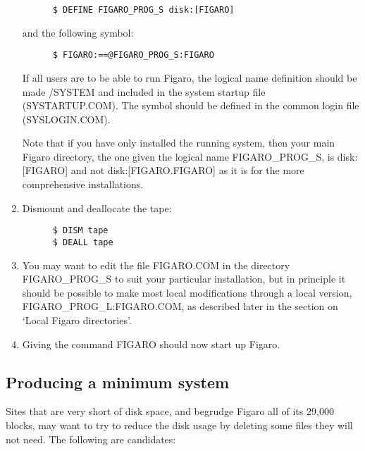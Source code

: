 \begin{enumerate}
\begin{verbatim}
      $ DEFINE FIGARO_PROG_S disk:[FIGARO]
\end{verbatim}
and the following symbol:
\begin{verbatim}
      $ FIGARO:==@FIGARO_PROG_S:FIGARO
\end{verbatim}
             
If all users are to be able to run Figaro, the logical name definition  should
be made /SYSTEM and included in the system startup file (SYSTARTUP.COM).  The
symbol should be defined in the common login file (SYSLOGIN.COM).

Note that if you have only installed the running system, then your main  Figaro
directory, the one given the logical name FIGARO\_PROG\_S, is disk:[FIGARO] and
not disk:[FIGARO.FIGARO] as it is for the more comprehensive installations.

\item Dismount and deallocate the tape:

\begin{verbatim}
      $ DISM tape
      $ DEALL tape
\end{verbatim}

\item You may want to edit the file FIGARO.COM in the directory FIGARO\_PROG\_S
to suit your particular installation, but in principle it should be possible to
make most local modifications through  a local version,
FIGARO\_PROG\_L:FIGARO.COM, as described later in the section on `Local Figaro
directories'.

\item Giving the command FIGARO should now start up Figaro.

\end{enumerate}

\subsection{Producing a minimum system}

Sites that are very short of disk space, and begrudge Figaro all of its  29,000
blocks, may want to try to reduce the disk usage by deleting some files they
will not need. The following are candidates:

